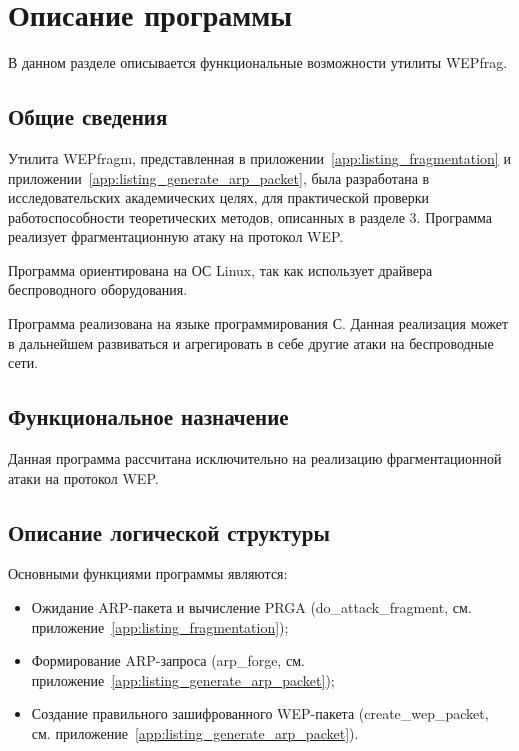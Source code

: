 \chapter{Описание программы}

В данном разделе описывается функциональные возможности утилиты WEPfrag.

\section{Общие сведения}

Утилита WEPfragm, представленная в приложении~\ref{app:listing_fragmentation} и
приложении~\ref{app:listing_generate_arp_packet}, была разработана в
исследовательских академических целях, для практической проверки
работоспособности теоретических методов, описанных в разделе 3. Программа
реализует фрагментационную атаку на протокол WEP.

Программа ориентирована на ОС Linux, так как использует драйвера беспроводного
оборудования. 

Программа реализована на языке программирования С. Данная реализация может в
дальнейшем развиваться и агрегировать в себе другие атаки на беспроводные сети.

\section{Функциональное назначение}

Данная программа рассчитана исключительно на реализацию фрагментационной атаки
на протокол WEP.

\section{Описание логической структуры}

Основными функциями программы являются:

\begin{itemize}
    \item{Ожидание ARP-пакета и вычисление PRGA (do\_attack\_fragment, см.
    приложение~\ref{app:listing_fragmentation});}
    \item{Формирование ARP-запроса (arp\_forge, см. 
    приложение~\ref{app:listing_generate_arp_packet});}
    \item{Создание правильного зашифрованного WEP-пакета (create\_wep\_packet, см. 
    приложение~\ref{app:listing_generate_arp_packet}).}
\end{itemize}

